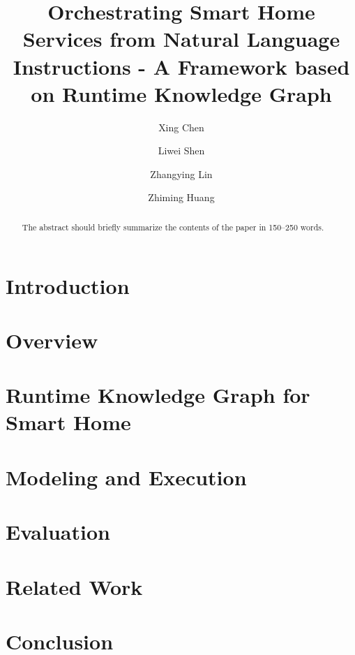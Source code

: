 \documentclass[runningheads]{llncs}
\begin{document}
%
\def \toolname {}
%
\title{Orchestrating Smart Home Services from Natural Language Instructions - A Framework based on Runtime Knowledge Graph}
%
%
\author{Xing Chen \and
Liwei Shen \and
Zhangying Lin \and
Zhiming Huang}
%
%

%
\maketitle              %
%
\begin{abstract}
The abstract should briefly summarize the contents of the paper in
150--250 words.

\end{abstract}
%
%
%
\section{Introduction}\label{sec:introduction}

\section{Overview}\label{sec:overview}

\section{Runtime Knowledge Graph for Smart Home}\label{sec:knowledgegraph}

\section{Modeling and Execution}\label{sec:execution}

\section{Evaluation}\label{sec:evaluation}

\section{Related Work}\label{sec:relatedwork}

\section{Conclusion}\label{sec:conclusion}






\end{document}
